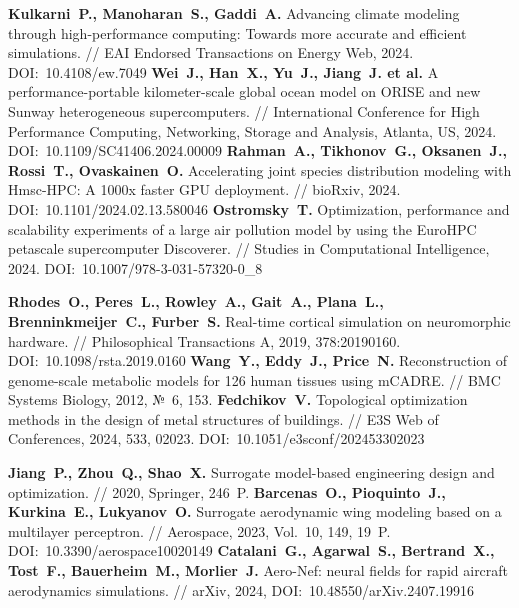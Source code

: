 \begin{thebibliography}{99}
%
\textbf{Kulkarni~P., Manoharan~S., Gaddi~A.} Advancing climate modeling through high-performance computing: Towards more accurate and efficient simulations. // EAI Endorsed Transactions on Energy Web, 2024. DOI:~10.4108/ew.7049
%
\textbf{Wei~J., Han~X., Yu~J., Jiang~J. et al.} A performance-portable kilometer-scale global ocean model on ORISE and new Sunway heterogeneous supercomputers. // International Conference for High Performance Computing, Networking, Storage and Analysis, Atlanta, US, 2024. DOI:~10.1109/SC41406.2024.00009
%
\textbf{Rahman~A., Tikhonov~G., Oksanen~J., Rossi~T., Ovaskainen~O.} Accelerating joint species distribution modeling with Hmsc-HPC: A 1000x faster GPU deployment. // bioRxiv, 2024. DOI:~10.1101/2024.02.13.580046
%
\textbf{Ostromsky~T.} Optimization, performance and scalability experiments of a large air pollution model by using the EuroHPC petascale supercomputer Discoverer. // Studies in Computational Intelligence, 2024. DOI:~10.1007/978-3-031-57320-0\_8
%



%
\textbf{Rhodes~O., Peres~L., Rowley~A., Gait~A., Plana~L., Brenninkmeijer~C., Furber~S.} Real-time cortical simulation
on neuromorphic hardware. // Philosophical Transactions A, 2019, 378:20190160. DOI:~10.1098/rsta.2019.0160
%
\textbf{Wang~Y., Eddy~J., Price~N.} Reconstruction of genome-scale metabolic models for 126 human tissues using mCADRE. // BMC Systems Biology, 2012, №~6, 153.
%
\textbf{Fedchikov~V.} Topological optimization methods in the design of metal structures of buildings. // E3S Web of Conferences, 2024, 533, 02023. DOI:~10.1051/e3sconf/202453302023
%



%
\textbf{Jiang~P., Zhou~Q., Shao~X.} Surrogate model-based engineering design and optimization. // 2020, Springer, 246~P.
%
\textbf{Barcenas~O., Pioquinto~J., Kurkina~E., Lukyanov~O.} Surrogate aerodynamic wing modeling based on a multilayer perceptron. // Aerospace, 2023, Vol.~10, 149, 19~P. DOI:~10.3390/aerospace10020149
%
\textbf{Catalani~G., Agarwal~S., Bertrand~X., Tost~F., Bauerheim~M., Morlier~J.} Aero-Nef: neural fields for rapid aircraft aerodynamics simulations. // arXiv, 2024, DOI:~10.48550/arXiv.2407.19916
%




\end{thebibliography}
